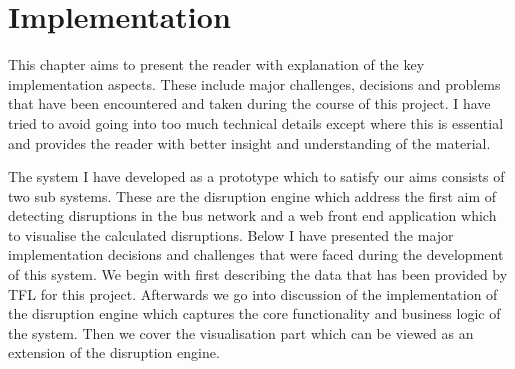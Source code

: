 \chapter{Implementation}
This chapter aims to present the reader with explanation of the key implementation aspects. These include major challenges, decisions and problems that have been encountered and taken during the course of this project. I have tried to avoid going into too much technical details except where this is essential and provides the reader with better insight and understanding of the material.

The system I have developed as a prototype which to satisfy our aims consists of two sub systems. These are the disruption engine which address the first aim of detecting disruptions in the bus network and a web front end application which to visualise the calculated disruptions. Below I have presented the major implementation decisions and challenges that were faced during the development of this system. We begin with first describing the data that has been provided by TFL for this project. Afterwards we go into discussion of the implementation of the disruption engine 
which captures the core functionality and business logic of the system. Then we cover the visualisation part which can be viewed as an extension of the disruption engine.

